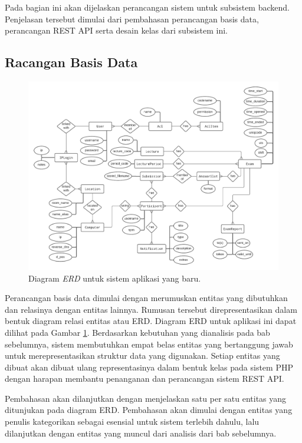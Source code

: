     Pada bagian ini akan dijelaskan perancangan sistem untuk subsistem backend.
    Penjelasan tersebut dimulai dari pembahasan perancangan basis data,
    perancangan REST API serta desain kelas dari subsistem ini.
    
\subsection{Racangan Basis Data}
    \begin{figure}
        \centering
        \includegraphics[width=1\paperwidth]{Gambar/erd-rev-b.pdf}
        \caption{Diagram \textit{ERD} untuk sistem aplikasi yang baru.}
        \label{fig:erd_overview}
    \end{figure}
    
    Perancangan basis data dimulai dengan merumuskan entitas yang dibutuhkan dan
    relasinya dengan entitas lainnya. Rumusan tersebut direpresentasikan dalam
    bentuk diagram relasi entitas atau ERD. Diagram ERD untuk aplikasi ini dapat
    dilihat pada Gambar \ref{fig:erd_overview}. Berdasarkan kebutuhan yang
    dianalisis pada bab sebelumnya, sistem membutuhkan empat belas entitas yang
    bertanggung jawab untuk merepresentasikan struktur data yang digunakan.
    Setiap entitas yang dibuat akan dibuat ulang representasinya dalam bentuk
    kelas pada sistem PHP dengan harapan membantu penanganan dan perancangan
    sistem REST API.
    
    Pembahasan akan dilanjutkan dengan menjelaskan satu per satu entitas yang
    ditunjukan pada diagram ERD. Pembahasan akan dimulai dengan entitas yang
    penulis kategorikan sebagai esensial untuk sistem terlebih dahulu, lalu
    dilanjutkan dengan entitas yang muncul dari analisis dari bab sebelumnya.
    
